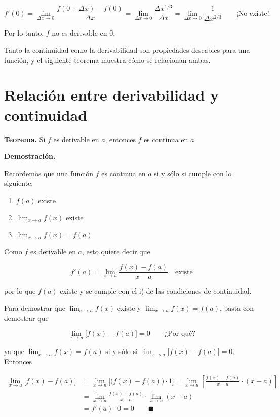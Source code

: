 \documentclass[12pt,tikz,border=5pt]{article}
\begin{document}
$$f'(0) = \lim_{\Delta x\to 0}\frac{f(0+\Delta x)-f(0)}{\Delta x} = \lim_{\Delta x\to 0}\frac{\Delta x^{1/3}}{\Delta x} = \lim_{\Delta x\to 0}\frac{1}{\Delta x^{2/3}} \qquad \text{¡No existe!}$$

Por lo tanto, $f$ no es derivable en $0$.

\bigskip

Tanto la continuidad como la derivabilidad son propiedades deseables para
una función, y el siguiente teorema muestra cómo se relacionan ambas.

\section{Relación entre derivabilidad y continuidad}

\textbf{Teorema.} Si $f$ es derivable en $a$, entonces $f$ es continua en
$a$.

\textbf{Demostración.}

Recordemos que una función $f$ es continua en $a$ si y sólo si cumple con
lo siguiente:

\begin{enumerate}[label=\roman*)]
\item $f(a)$ existe
\item $\displaystyle\lim_{x\to a} f(x)$ existe
\item $\displaystyle\lim_{x\to a} f(x) = f(a)$
\end{enumerate}

Como $f$ es derivable en $a$, esto quiere decir que

$$f'(a) = \lim_{x\to a}\frac{f(x)-f(a)}{x-a} \quad \text{existe}$$

por lo que $f(a)$ existe y se cumple con el i) de las condiciones de
continuidad.

Para demostrar que $\displaystyle\lim_{x\to a} f(x)$ existe y
$\displaystyle\lim_{x\to a} f(x) = f(a)$, basta con demostrar que

$$\lim_{x\to a}\big[f(x)-f(a)\big] = 0 \qquad \text{¿Por qué?}$$

ya que $\displaystyle\lim_{x\to a} f(x) = f(a)$ si y sólo si
$\displaystyle\lim_{x\to a}\big[f(x)-f(a)\big] = 0$. Entonces

\begin{align*}
\lim_{x\to a}\big[f(x)-f(a)\big] &= \lim_{x\to a}\big[\big(f(x)-f(a)\big)\cdot 1\big] = \lim_{x\to a}\left[\frac{f(x)-f(a)}{x-a}\cdot(x-a)\right] \\[4pt]
&= \lim_{x\to a}\frac{f(x)-f(a)}{x-a}\cdot \lim_{x\to a}(x-a) \\[4pt]
&= f'(a)\cdot 0 = 0 \qquad \blacksquare
\end{align*}
\end{document}
